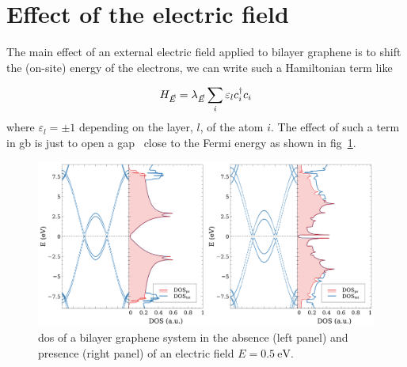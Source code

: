  \section{Effect of the electric field}
The main effect of an external electric field applied to bilayer graphene is to shift the (on-site) energy of the electrons, we can write such a Hamiltonian term like

\begin{equation}
  H_{\vec{E}} = \lambda_{\vec{E}}\sum_i \varepsilon_l c^{\dagger}_{i}c_{i}
\end{equation}
where $\varepsilon_l=\pm1$ depending on the layer, $l$,  of the atom $i$.
The effect of such a term in \ac{gb} is just to open a gap~\cite{Yamashiro2012} close to the Fermi energy as shown in fig~\ref{bi_Efield}.

\begin{figure}[h!]
  \centering
  \includegraphics[width=\textwidth]{chapter06/figures/bilayer_elec.pdf}
  \vspace{-10pt}
  \caption{\ac{dos} of a bilayer graphene system in the absence (left panel) and presence (right panel) of an electric field $E=\SI{0.5}{\eV}$.} %
  \label{bi_Efield}
\end{figure}
\FloatBarrier




